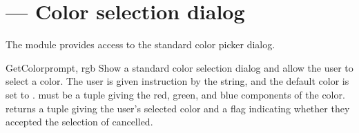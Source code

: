 \section{ ---
         Color selection dialog}

\modulesynopsis{}


The  module provides access to the standard color
picker dialog.


\begin{funcdesc}{GetColor}{prompt, rgb}
  Show a standard color selection dialog and allow the user to select
  a color.  The user is given instruction by the  string,
  and the default color is set to .   must be a
  tuple giving the red, green, and blue components of the color.
   returns a tuple giving the user's selected
  color and a flag indicating whether they accepted the selection of
  cancelled.
\end{funcdesc}
